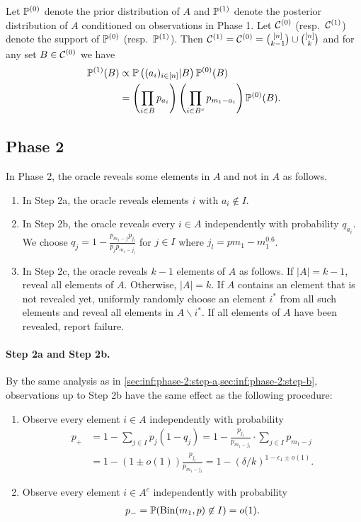 Let $\mathbb{P}^{(0)}$ denote the prior distribution of $A$ and $\mathbb{P}^{(1)}$ denote the posterior distribution of $A$ conditioned on observations in Phase 1.
Let $\mathcal{C}^{(0)}$ (resp.~$\mathcal{C}^{(1)}$) denote the support of $\mathbb{P}^{(0)}$ (resp.~$\mathbb{P}^{(1)}$).
Then $\mathcal{C}^{(1)} = \mathcal{C}^{(0)} = \binom{[n]}{k-1} \cup \binom{[n]}k$ and for any set $B \in \mathcal{C}^{(0)}$ we have
\begin{align*}
  \mathbb{P}^{(1)}(B) &\propto \mathbb{P}\left((a_i)_{i\in [n]} | B\right) \mathbb{P}^{(0)}(B) \\
  \nonumber &= \left(\prod_{i\in B} p_{a_i}\right) \left(\prod_{i\in B^c} p_{m_1-a_i}\right) \mathbb{P}^{(0)}(B).
\end{align*}

\subsection{Phase 2} \label{sec:th-small:phase-2}
In Phase 2, the oracle reveals some elements in $A$ and not in $A$ as follows.
\begin{enumerate}[label=2\alph*.]
  \item In Step 2a, the oracle reveals elements $i$ with $a_i\not \in I$.
  \item In Step 2b, the oracle reveals every $i\in A$ independently with probability $q_{a_i}$. We choose $q_j = 1-\frac{p_{m_1-j} p_{j_l}}{p_j p_{m_1-j_l}}$ for $j\in I$ where $j_l = p m_1 - m_1^{0.6}$.
  \item In Step 2c, the oracle reveals $k-1$ elements of $A$ as follows. If $|A|=k-1$, reveal all elements of $A$. Otherwise, $|A|=k$. If $A$ contains an element that is not revealed yet, uniformly randomly choose an element $i^*$ from all such elements and reveal all elements in $A\backslash i^*$. If all elements of $A$ have been revealed, report failure.
\end{enumerate}

\paragraph{Step 2a and Step 2b.}
By the same analysis as in \cref{sec:inf:phase-2:step-a,sec:inf:phase-2:step-b}, observations up to Step 2b have the same effect as the following procedure:
\begin{enumerate}[label=(\arabic*)]
  \item Observe every element $i\in A$ independently with probability
  \begin{align*}
    p_+ &= 1-\sum_{j\in I} p_j (1-q_j)
    = 1 - \frac{p_{j_l}}{p_{m_1-j_l}} \cdot \sum_{j\in I} p_{m_1-j} \\
    \nonumber &= 1-(1\pm o(1)) \frac{p_{j_l}}{p_{m_1-j_l}} = 1-(\delta/k)^{1-\epsilon_1\pm o(1)}.
  \end{align*}
  \item Observe every element $i\in A^c$ independently with probability
  \begin{align*}
    p_- = \mathbb{P}(\operatorname{\mathrm{Bin}}(m_1,p)\not \in I) = o(1).
  \end{align*}
\end{enumerate}

